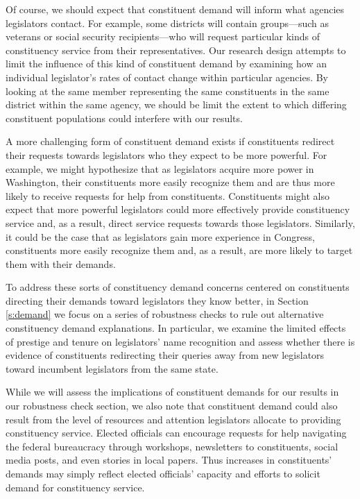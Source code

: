\documentclass[12pt]{article}
\begin{document}
Of course, we should expect that constituent demand will inform what agencies legislators contact. For example, some districts will contain groups---such as veterans or social security recipients---who will request particular kinds of constituency service from their representatives. Our research design attempts to limit the influence of this kind of constituent demand by examining how an individual legislator's rates of contact change within particular agencies. By looking at the same member representing the same constituents in the same district within the same agency, we should be limit the extent to which differing constituent populations could interfere with our results. 

A more challenging form of constituent demand exists if constituents redirect their requests towards legislators who they expect to be more powerful. For example, we might hypothesize that as legislators acquire more power in Washington, their constituents more easily recognize them and are thus more likely to receive requests for help from constituents. Constituents might also expect that more powerful legislators could more effectively provide constituency service and, as a result, direct service requests towards those legislators. Similarly, it could be the case that as legislators gain more experience in Congress, constituents more easily recognize them and, as a result, are more likely to target them with their demands. 

To address these sorts of constituency demand concerns centered on constituents directing their demands toward legislators they know better, in Section \ref{s:demand} we focus on a series of robustness checks to rule out alternative constituency demand explanations. In particular, we examine the limited effects of prestige and tenure on legislators' name recognition and assess whether there is evidence of constituents redirecting their queries away from new legislators toward incumbent legislators from the same state. 

While we will assess the implications of constituent demands for our results in our robustness check section, we also note that constituent demand could also result from the level of resources and attention legislators allocate to providing constituency service. Elected officials can encourage requests for help navigating the federal bureaucracy through workshops, newsletters to constituents, social media posts, and even stories in local papers. Thus increases in constituents' demands may simply reflect elected officials' capacity and efforts to solicit demand for constituency service.
\end{document}
